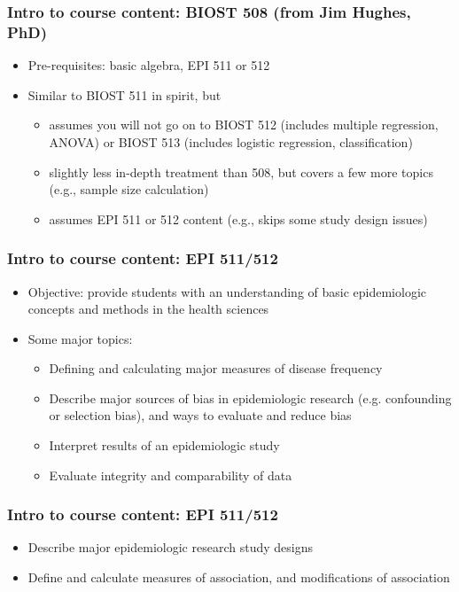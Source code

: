 \documentclass[12pt]{beamer}
\newcommand{\myframe}[1]{\begin{frame} \frametitle{#1}}
\newenvironment{spaceitemize}
{ \begin{itemize}
    \setlength{\itemsep}{10pt}
    \setlength{\parskip}{0pt}
    \setlength{\parsep}{0pt}     }
{ \end{itemize}                  }
\begin{document}
\myframe{Intro to course content: BIOST 508 \small (from Jim Hughes, PhD)}
\begin{spaceitemize}
\item Pre-requisites: basic algebra, EPI 511 or 512
\item Similar to BIOST 511 in spirit, but 
\begin{spaceitemize}
\item assumes you will not go on to BIOST 512 (includes multiple regression, ANOVA) or BIOST 513 (includes logistic regression, classification)
\item slightly less in-depth treatment than 508, but covers a few more topics (e.g., sample size calculation)
\item assumes EPI 511 or 512 content (e.g., skips some study design issues)
\end{spaceitemize}
\end{spaceitemize}
\end{frame}
\myframe{Intro to course content: EPI 511/512}
\begin{spaceitemize}
\item Objective: provide students with an understanding of basic epidemiologic concepts and methods in the health sciences 
\item Some major topics:
\begin{spaceitemize}
\item Defining and calculating major measures of disease frequency
\item Describe major sources of bias in epidemiologic research (e.g. confounding or selection bias), and ways to evaluate and reduce bias
\item Interpret results of an epidemiologic study
\item Evaluate integrity and comparability of data
\end{spaceitemize}
\end{spaceitemize}
\end{frame}

\myframe{Intro to course content: EPI 511/512}
\begin{spaceitemize}
\item Describe major epidemiologic research study designs
\item Define and calculate measures of association, and modifications of association
\end{spaceitemize}
\end{frame}
\end{document}
